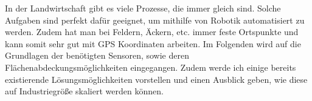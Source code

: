 
In der Landwirtschaft gibt es viele Prozesse, die immer gleich sind. Solche Aufgaben sind perfekt dafür geeignet, um mithilfe von Robotik automatisiert zu werden. Zudem hat man bei Feldern, Äckern, etc. immer feste Ortspunkte und kann somit sehr gut mit GPS Koordinaten arbeiten.
Im Folgenden wird auf die Grundlagen der benötigten Sensoren, sowie deren Flächenabdeckungsmöglichkeiten eingegangen.
Zudem werde ich einige bereits existierende Lösungsmöglichkeiten vorstellen und einen Ausblick geben, wie diese auf Industriegröße skaliert werden können.
	
